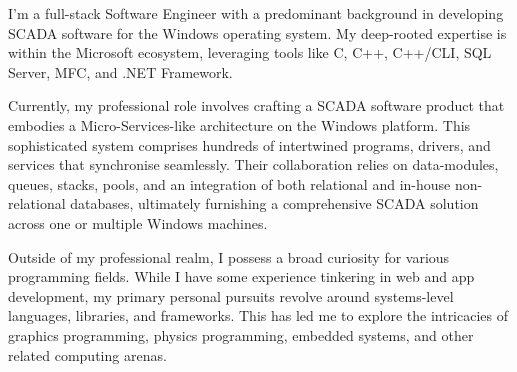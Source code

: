 \documentclass[9pt]{developercv} %
\begin{document}
\vspace{0.5cm}


\begin{minipage}[t]{1\textwidth} %


	I'm a full-stack Software Engineer with a predominant background in developing SCADA software for the Windows operating system. My deep-rooted expertise is within the Microsoft ecosystem, leveraging tools like C, C++, C++/CLI, SQL Server, MFC, and .NET Framework.

	\vspace{0.5cm}	

	Currently, my professional role involves crafting a SCADA software product that embodies a Micro-Services-like architecture on the Windows platform. This sophisticated system comprises hundreds of intertwined programs, drivers, and services that synchronise seamlessly. Their collaboration relies on data-modules, queues, stacks, pools, and an integration of both relational and in-house non-relational databases, ultimately furnishing a comprehensive SCADA solution across one or multiple Windows machines.
	
	\vspace{0.5cm}	

	Outside of my professional realm, I possess a broad curiosity for various programming fields. While I have some experience tinkering in web and app development, my primary personal pursuits revolve around systems-level languages, libraries, and frameworks. This has led me to explore the intricacies of graphics programming, physics programming, embedded systems, and other related computing arenas.

\end{minipage}

\vspace{1cm}	

\end{document}
